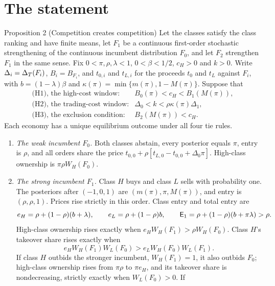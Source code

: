 \section{The statement}\label{sec:ccc-statement}

\begin{paperresult}{Proposition 2 (Competition creates competition)}
Let the classes satisfy the class ranking and have finite means, let \(F_1\) be a continuous first-order
stochastic strengthening of the continuous incumbent distribution \(F_0\), and let \(F_2\) strengthen \(F_1\) in
the same sense. Fix \(0<\pi,\rho,\lambda<1\), \(0<\beta<1/2\), \(c_H>0\) and \(k>0\). Write \(\Delta_i=\Delta_T(F_i)\),
\(B_i=B_{F_i}\), and \(t_{0,i}\) and \(t_{L,i}\) for the proceeds \(t_0\) and \(t_L\) against \(F_i\), with
\(b=(1-\lambda)\beta\) and \(\kappa(\pi)=\min\{m(\pi),1-M(\pi)\}\). Suppose that
\[
\begin{array}{ll}
\text{(H1), the high-cost window:}& B_0(\pi)<c_H<B_1(M(\pi)),\\
\text{(H2), the trading-cost window:}& \Delta_0<k<\rho\kappa(\pi)\Delta_1,\\
\text{(H3), the exclusion condition:}& B_2(M(\pi))<c_H.
\end{array}
\]
Each economy has a unique equilibrium outcome under all four tie rules.
\begin{enumerate}[label=(\roman*),leftmargin=2em]
\item \emph{The weak incumbent \(F_0\).} Both classes abstain, every posterior equals \(\pi\), entry is \(\rho\),
  and all orders share the price \(t_{0,0}+\rho[t_{L,0}-t_{0,0}+\Delta_0\pi]\). High-class ownership is
  \(\pi\rho W_H(F_0)\).
\item \emph{The strong incumbent \(F_1\).} Class \(H\) buys and class \(L\) sells with probability one. The
  posteriors after \((-1,0,1)\) are \((m(\pi),\pi,M(\pi))\), and entry is \((\rho,\rho,1)\). Prices rise strictly in
  this order. Class entry and total entry are
  \[
  e_H=\rho+(1-\rho)(b+\lambda),\qquad e_L=\rho+(1-\rho)b,\qquad \mathsf{E}_1=\rho+(1-\rho)(b+\pi\lambda)>\rho.
  \]
  High-class ownership rises exactly when \(e_HW_H(F_1)>\rho W_H(F_0)\). Class \(H\)'s takeover share rises exactly
  when
  \begin{equation}\label{eq:ccc-share}
  e_HW_H(F_1)W_L(F_0)>e_LW_H(F_0)W_L(F_1).
  \end{equation}
  If class \(H\) outbids the stronger incumbent, \(W_H(F_1)=1\), it also outbids \(F_0\); high-class ownership rises
  from \(\pi\rho\) to \(\pi e_H\), and its takeover share is nondecreasing, strictly exactly when \(W_L(F_0)>0\). If

\end{enumerate}
\end{paperresult}

